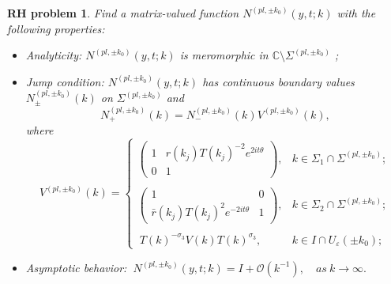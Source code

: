 \documentclass[11pt]{article}
\numberwithin{equation}{section}
\newtheorem{RHP}{RH problem}
\begin{document}
\begin{RHP}\label{rhp21}
       Find a   matrix-valued function $N^{(pl,\pm k_0)}(y,t;k)$ with the following properties:
       \begin{itemize}
  \item Analyticity: $N^{(pl,\pm k_0)}(y,t;k)$ is meromorphic in $\mathbb{C}\setminus \Sigma^{(pl,\pm k_0)}$ ;
  \item Jump condition: $N^{(pl,\pm k_0)}(y,t;k)$ has continuous boundary values $N^{(pl,\pm k_0)}_{\pm}(k)$ on $\Sigma^{(pl,\pm k_0)}$ and
 \begin{equation*}
N^{(pl,\pm k_0)}_+(k)=N^{(pl,\pm k_0)}_-(k)V^{(pl,\pm k_0)}(k),
\end{equation*}
where
\begin{equation*}
V^{(pl,\pm k_0)}(k)=\left\{\begin{array}{lll}
\left(\begin{array}{cc}
1 & r(k_j)T(k_j)^{-2} e^{2it\theta}\\
0 & 1
\end{array}\right), & k\in \Sigma_{1}\cap\Sigma^{(pl,\pm k_0)};\\
\\
\left(\begin{array}{cc}
1 & 0\\
\bar{r}(k_j)T(k_j)^{2}e^{-2it\theta} & 1
\end{array}\right),  &k\in \Sigma_{2}\cap\Sigma^{(pl,\pm k_0)};\\ \\
\ T(k)^{-\sigma_3}V(k)T(k)^{\sigma_3},&k\in I\cap U_{\varepsilon}(\pm k_0);

\end{array}\right.
\end{equation*}
  \item Asymptotic behavior:
  $\ N^{(pl,\pm k_0)}(y,t;k)=I+\mathcal{O}(k^{-1}),\quad as \ k\to \infty.$
\end{itemize}
\end{RHP}
\end{document}
